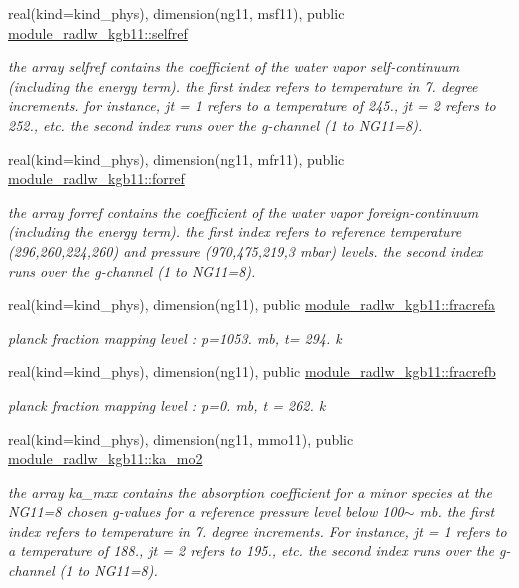 \begin{Indent}
\begin{DoxyCompactItemize}
real(kind=kind\+\_\+phys), dimension(ng11, msf11), public \hyperlink{group__module__radlw__kgbnn_gac98edefcce668d56c3aadc241863741f}{module\+\_\+radlw\+\_\+kgb11\+::selfref}
\begin{DoxyCompactList}\small\item\em the array selfref contains the coefficient of the water vapor self-\/continuum (including the energy term). the first index refers to temperature in 7. degree increments. for instance, jt = 1 refers to a temperature of 245., jt = 2 refers to 252., etc. the second index runs over the g-\/channel (1 to N\+G11=8). \end{DoxyCompactList}\item 
real(kind=kind\+\_\+phys), dimension(ng11, mfr11), public \hyperlink{group__module__radlw__kgbnn_ga9239d06fcd3fca0f13302c1ae4eb5a60}{module\+\_\+radlw\+\_\+kgb11\+::forref}
\begin{DoxyCompactList}\small\item\em the array forref contains the coefficient of the water vapor foreign-\/continuum (including the energy term). the first index refers to reference temperature (296,260,224,260) and pressure (970,475,219,3 mbar) levels. the second index runs over the g-\/channel (1 to N\+G11=8). \end{DoxyCompactList}\item 
real(kind=kind\+\_\+phys), dimension(ng11), public \hyperlink{group__module__radlw__kgbnn_ga5bf6552fb9c1e7c35729b2aea885306e}{module\+\_\+radlw\+\_\+kgb11\+::fracrefa}
\begin{DoxyCompactList}\small\item\em planck fraction mapping level \+: p=1053. mb, t= 294. k \end{DoxyCompactList}\item 
real(kind=kind\+\_\+phys), dimension(ng11), public \hyperlink{group__module__radlw__kgbnn_ga0a89a2686ebc70a2c0d8577b89384a56}{module\+\_\+radlw\+\_\+kgb11\+::fracrefb}
\begin{DoxyCompactList}\small\item\em planck fraction mapping level \+: p=0. mb, t = 262. k \end{DoxyCompactList}\item 
real(kind=kind\+\_\+phys), dimension(ng11, mmo11), public \hyperlink{group__module__radlw__kgbnn_ga8791eb290525c0d08fefa33ca23569c8}{module\+\_\+radlw\+\_\+kgb11\+::ka\+\_\+mo2}
\begin{DoxyCompactList}\small\item\em the array ka\+\_\+mxx contains the absorption coefficient for a minor species at the N\+G11=8 chosen g-\/values for a reference pressure level below 100$\sim$ mb. the first index refers to temperature in 7. degree increments. For instance, jt = 1 refers to a temperature of 188., jt = 2 refers to 195., etc. the second index runs over the g-\/channel (1 to N\+G11=8). \end{DoxyCompactList}\item 

\end{DoxyCompactItemize}
\end{Indent}
